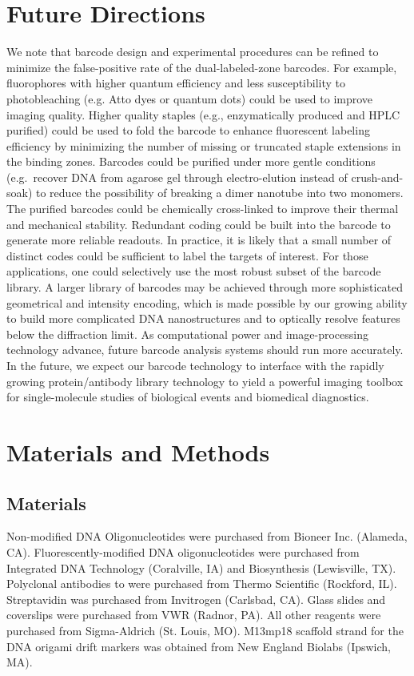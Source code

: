 \section{Future Directions}
We note that  barcode design and experimental procedures can be refined to 
 minimize the false-positive rate of the dual-labeled-zone barcodes. For example, 
fluorophores with higher quantum efficiency and less susceptibility to photobleaching 
(e.g. Atto dyes or quantum dots) could be used to improve imaging quality. Higher 
quality staples (e.g., enzymatically produced and HPLC purified) could be used to fold 
the barcode to enhance fluorescent labeling efficiency by minimizing the number of 
missing or truncated staple extensions in the binding zones. Barcodes could be purified 
under more gentle conditions (e.g.~recover DNA from agarose gel through electro-elution \citep{bellot_recovery_2011} instead of crush-and-soak) to reduce the possibility of breaking a dimer 
nanotube into two monomers. The purified barcodes could be chemically cross-linked \citep{rajendran_photo-cross-linking-assisted_2011}
to improve their thermal and mechanical stability. Redundant coding could be built into 
the barcode to generate more reliable readouts. In practice, it is likely that a small number 
of distinct codes could be sufficient to label the targets of interest. For those 
applications, one could selectively use the most robust subset of the barcode library. A 
larger library of barcodes may be achieved through more sophisticated geometrical and 
intensity encoding, which is made possible by our growing ability to build more 
complicated DNA nanostructures and to optically resolve features below the diffraction 
limit. As computational power and image-processing technology 
advance, future barcode analysis systems should run more accurately. In the future, we 
expect our barcode technology to interface with the rapidly growing protein/antibody 
library technology to yield a powerful imaging toolbox for single-molecule studies of 
biological events and biomedical diagnostics. 


\section{Materials and Methods}
\subsection{Materials}
Non-modified DNA Oligonucleotides were purchased from Bioneer Inc. (Alameda, CA). Fluorescently-modified DNA oligonucleotides were purchased from Integrated DNA Technology (Coralville, IA) and Biosynthesis (Lewisville, TX). Polyclonal antibodies to  were purchased from Thermo Scientific (Rockford, IL). Streptavidin was purchased from Invitrogen (Carlsbad, CA). Glass slides and coverslips were purchased from VWR (Radnor, PA). All other reagents were purchased from Sigma-Aldrich (St. Louis, MO). M13mp18 scaffold strand for the DNA origami drift markers was obtained from New England Biolabs (Ipswich, MA).

